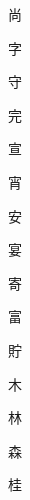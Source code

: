 \begin{spacing}{2.5}
{\Huge \begin{CJK}{UTF8}{min} 尚\end{CJK}}\hspace{0.1cm}
{\Huge \begin{CJK}{UTF8}{min} 字\end{CJK}}\hspace{0.1cm}
{\Huge \begin{CJK}{UTF8}{min} 守\end{CJK}}\hspace{0.1cm}
{\Huge \begin{CJK}{UTF8}{min} 完\end{CJK}}\hspace{0.1cm}
{\Huge \begin{CJK}{UTF8}{min} 宣\end{CJK}}\hspace{0.1cm}
{\Huge \begin{CJK}{UTF8}{min} 宵\end{CJK}}\hspace{0.1cm}
{\Huge \begin{CJK}{UTF8}{min} 安\end{CJK}}\hspace{0.1cm}
{\Huge \begin{CJK}{UTF8}{min} 宴\end{CJK}}\hspace{0.1cm}
{\Huge \begin{CJK}{UTF8}{min} 寄\end{CJK}}\hspace{0.1cm}
{\Huge \begin{CJK}{UTF8}{min} 富\end{CJK}}\hspace{0.1cm}
{\Huge \begin{CJK}{UTF8}{min} 貯\end{CJK}}\hspace{0.1cm}
{\Huge \begin{CJK}{UTF8}{min} 木\end{CJK}}\hspace{0.1cm}
{\Huge \begin{CJK}{UTF8}{min} 林\end{CJK}}\hspace{0.1cm}
{\Huge \begin{CJK}{UTF8}{min} 森\end{CJK}}\hspace{0.1cm}
{\Huge \begin{CJK}{UTF8}{min} 桂\end{CJK}}\hspace{0.1cm}

\end{spacing}
